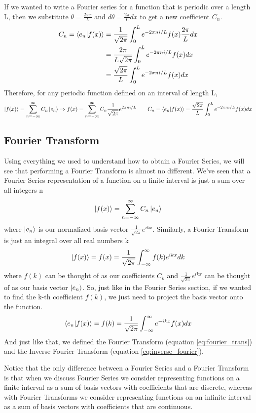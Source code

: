 \documentclass{article}
\newcommand{\be}{\begin{equation}}
\newcommand{\ee}{\end{equation}}
\begin{document}
If we wanted to write a Fourier series for a function that is periodic over a length L, then we substitute $\theta = \frac{2 \pi x}{L}$ and $d\theta = \frac{2 \pi}{L} dx$ to get a new coefficient $C_n$.
\be
  \begin{split}
    C_n = \braket{e_n|f(x)} &= \frac{1}{\sqrt{2 \pi}} \int_0^L e^{- 2 \pi n i / L} f(x) \frac{2 \pi}{L} dx \\
    &= \frac{2 \pi}{L \sqrt{2 \pi}} \int_0^L e^{- 2 \pi n i / L} f(x) dx \\
    &= \frac{\sqrt{2 \pi}}{L} \int_0^L e^{- 2 \pi n i / L} f(x) dx \\
  \end{split}
\ee
Therefore, for any periodic function defined on an interval of length L,
\be
  \ket{f(x)} = \sum_{n = -\infty}^{\infty} C_n \ket{e_n} \Rightarrow f(x) = \sum_{n = -\infty}^{\infty} C_n \frac{1}{\sqrt{2 \pi}} e^{2 \pi n i / L} \qquad C_n = \braket{e_n|f(x)} = \frac{\sqrt{2 \pi}}{L} \int_0^L e^{- 2 \pi n i / L} f(x) dx
\ee

\subsection*{Fourier Transform}
Using everything we used to understand how to obtain a Fourier Series, we will see that performing a Fourier Transform is almost no different.
We've seen that a Fourier Series representation of a function on a finite interval is just a sum over all integers n
\be
  \ket{f(x)} = \sum_{n=-\infty}^{\infty} C_n \ket{e_n}
\ee
where $\ket{e_n}$ is our normalized basis vector $\frac{1}{\sqrt{2 \pi}} e^{ikx}$.
Similarly, a Fourier Transform is just an integral over all real numbers k
\be \label{eq:fourier_trans}
  \ket{f(x)} = f(x) = \frac{1}{\sqrt{2 \pi}} \int_{- \infty}^{\infty} f(k) e^{i k x} dk
\ee
where $f(k)$ can be thought of as our coefficients $C_k$ and $\frac{1}{\sqrt{2 \pi}} e^{ikx}$ can be thought of as our basis vector $\ket{e_n}$.
So, just like in the Fourier Series section, if we wanted to find the k-th coefficient $f(k)$, we just need to project the basis vector onto the function.
\be \label{eq:inverse_fourier}
  \braket{e_n|f(x)} = f(k) = \frac{1}{\sqrt{2 \pi}} \int_{- \infty}^{\infty} e^{-ikx} f(x) dx
\ee
And just like that, we defined the Fourier Transform (equation \ref{eq:fourier_trans}) and the Inverse Fourier Transform (equation \ref{eq:inverse_fourier}).

Notice that the only difference between a Fourier Series and a Fourier Transform is that when we discuss Fourier Series we consider representing functions on a finite interval as a sum of basis vectors with coefficients that are discrete, whereas with Fourier Transforms we consider representing functions on an infinite interval as a sum of basis vectors with coefficients that are continuous.
\end{document}
